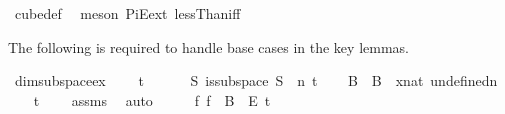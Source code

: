 \begin{isabellebody}
\ cube{\isacharunderscore}{\kern0pt}def\ \isamarkupfalse%
\ {\isacharparenleft}{\kern0pt}meson\ PiE{\isacharunderscore}{\kern0pt}ext\ lessThan{\isacharunderscore}{\kern0pt}iff{\isacharparenright}{\kern0pt}\isanewline
{}\isamarkupfalse%
%
\endisatagproof
{\isafoldproof}%
%
\isadelimproof
%
\endisadelimproof
%
\begin{isamarkuptext}%
The following is required to handle base cases in the key lemmas.%
\end{isamarkuptext}\isamarkuptrue%
\isamarkupfalse%
\ dim{}{\isacharunderscore}{\kern0pt}subspace{\isacharunderscore}{\kern0pt}ex{\isacharcolon}{\kern0pt}\ \isanewline
\ \ \ {\isachardoublequoteopen}t\ {\isachargreater}{\kern0pt}\ {}{\isachardoublequoteclose}\ \isanewline
\ \ \ {\isachardoublequoteopen}{\isasymexists}S{\isachardot}{\kern0pt}\ is{\isacharunderscore}{\kern0pt}subspace\ S\ {}\ n\ t{\isachardoublequoteclose}\isanewline
%
\isadelimproof
%
\endisadelimproof
%
\isatagproof
{}\isamarkupfalse%
{\isacharminus}{\kern0pt}\isanewline
\ \ \isamarkupfalse%
\ B\ \ {\isachardoublequoteopen}B\ {\isasymequiv}\ {\isacharparenleft}{\kern0pt}{\isasymlambda}x{\isacharcolon}{\kern0pt}{\isacharcolon}{\kern0pt}nat{\isachardot}{\kern0pt}\ undefined{\isacharparenright}{\kern0pt}{\isacharparenleft}{\kern0pt}{}{\isacharcolon}{\kern0pt}{\isacharequal}{\kern0pt}{\isacharbraceleft}{\kern0pt}{\isachardot}{\kern0pt}{\isachardot}{\kern0pt}{\isacharless}{\kern0pt}n{\isacharbraceright}{\kern0pt}{\isacharparenright}{\kern0pt}{\isachardoublequoteclose}\isanewline
\isanewline
\ \ \isamarkupfalse%
\ {\isachardoublequoteopen}{\isacharbraceleft}{\kern0pt}{\isachardot}{\kern0pt}{\isachardot}{\kern0pt}{\isacharless}{\kern0pt}t{\isacharbraceright}{\kern0pt}\ {\isasymnoteq}\ {\isacharbraceleft}{\kern0pt}{\isacharbraceright}{\kern0pt}{\isachardoublequoteclose}\ \isamarkupfalse%
\ assms\ \isamarkupfalse%
\ auto\isanewline
\ \ \isamarkupfalse%
\ \isamarkupfalse%
\ {\isachardoublequoteopen}{\isasymexists}f{\isachardot}{\kern0pt}\ f\ {\isasymin}\ {\isacharparenleft}{\kern0pt}B\ {}{\isacharparenright}{\kern0pt}\ {\isasymrightarrow}\isactrlsub E\ {\isacharbraceleft}{\kern0pt}{\isachardot}{\kern0pt}{\isachardot}{\kern0pt}{\isacharless}{\kern0pt}t{\isacharbraceright}{\kern0pt}{\isachardoublequoteclose}\ \isanewline
\ \ \ \ \isamarkupfalse%

\end{isabellebody}
